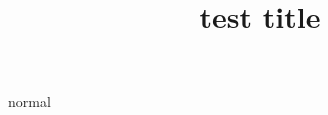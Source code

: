 \documentclass{beamer}
\title{test title}
\begin{document}
    \begin{frame}[plain,b]
        \titlepage
    \end{frame} 

    \begin{frame}
        normal
    \end{frame}
\end{document}
